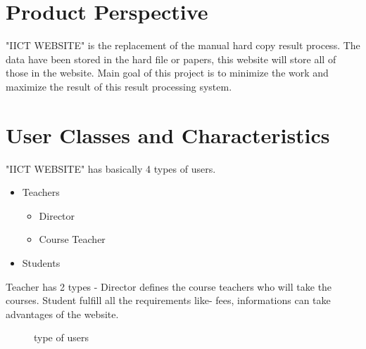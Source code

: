 \documentclass{scrreprt}
\begin{document}
    \section{Product Perspective}
    "IICT WEBSITE" is the replacement of the manual hard copy result process. The data have been stored in the hard file or papers, this website will store all of those in the website. Main goal of this project is to minimize the work and maximize the result of this result processing system.
    
    \section{User Classes and Characteristics}
    "IICT WEBSITE" has basically 4 types of users. 
    \begin{itemize}
      \item Teachers
        \begin{itemize}
            \item Director
            \item Course Teacher
        \end{itemize}
      \item Students 
    \end{itemize}
    Teacher has 2 types - Director defines the course teachers who will take the courses. Student fulfill all the requirements like- fees, informations can take advantages of the website. 
    \begin{figure}
        \centering 
        \caption{type of users}
        \label{fig:type of users}
    \end{figure}
\end{document}
